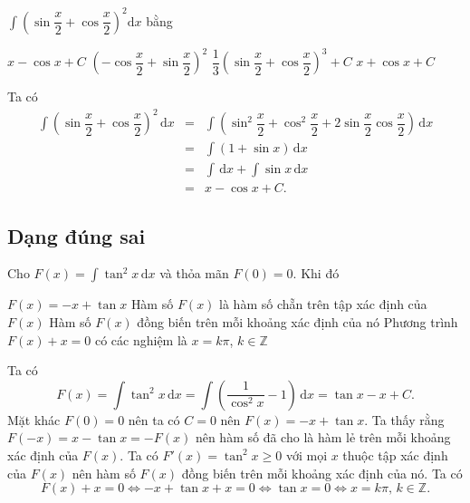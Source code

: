 \documentclass[12pt,aspectratio=169]{beamer}
\begin{document}
\begin{tracnghiem}%
	$\displaystyle \int \left(\sin \dfrac{x}{2}+\cos\dfrac{x}{2} \right)^2 \mathrm{d}x$ bằng

	\choice
		{\True $x-\cos x+C$}
		{$\left(-\cos \dfrac{x}
		{2}+\sin\dfrac{x}
		{2} \right)^2$}
		{$\dfrac{1}{3} \left(\sin \dfrac{x}{2}+\cos\dfrac{x}{2}\right)^3+C$}
		{$x+\cos x+C$}

	\begin{loigiai}
			Ta có
			\allowdisplaybreaks
			\begin{eqnarray*}
				\displaystyle \int \left(\sin \dfrac{x}{2}+\cos\dfrac{x}{2} \right)^2 \mathrm{\,d}x &=& \displaystyle \int \left(\sin^2 \dfrac{x}{2}+\cos^2\dfrac{x}{2}+2\sin \dfrac{x}{2}\cos \dfrac{x}{2} \right) \mathrm{\,d}x\\
				&=& \displaystyle \int (1+\sin x) \mathrm{\,d}x\\
				&=& \displaystyle \int \mathrm{\,d}x+\displaystyle \int \sin x \mathrm{\,d}x\\
				&=& x-\cos x+C.
		\end{eqnarray*}
	\end{loigiai}
\end{tracnghiem}

\subsection{Dạng đúng sai}

\begin{dungsai}%
	Cho $F(x)=\displaystyle \int \tan^2x\mathrm{\,d}x$ và thỏa mãn $F(0)=0$. Khi đó

	\choiceTF
		{\True $F(x)=-x+\tan x$}
		{Hàm số $F(x)$ là hàm số chẵn trên tập xác định của $F(x)$}
		{\True Hàm số $F(x)$ đồng biến trên mỗi khoảng xác định của nó}
		{\True Phương trình $F(x)+x=0$ có các nghiệm là $x=k\pi$, $k\in \mathbb{Z}$}

	\begin{loigiai}
			\begin{itemchoice}
				\itemch Ta có
				\[\displaystyle F(x)=\int \tan^2x\mathrm{\,d}x
				=\int \left(\dfrac{1}{\cos^2x}-1\right)\mathrm{\,d}x
				=\tan x-x+C.\]
				Mặt khác $F(0)=0$ nên ta có $C=0$ nên $F(x)=-x+\tan x$.
				\itemch Ta thấy rằng $F(-x)=x-\tan x=-F(x)$ nên hàm số đã cho là hàm lẻ trên mỗi khoảng xác định của $F(x)$.
				\itemch Ta có $F'(x)=\tan^2x\ge 0$ với mọi $x$ thuộc tập xác định của $F(x)$ nên hàm số $F(x)$ đồng biến trên mỗi khoảng xác định của nó.
				\itemch Ta có
				\[F(x)+x=0\Leftrightarrow -x+\tan x+x=0\Leftrightarrow \tan x=0\Leftrightarrow x=k\pi,\,k\in \mathbb{Z}.\]
		\end{itemchoice}
	\end{loigiai}
\end{dungsai}
\end{document}
